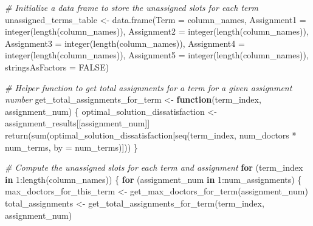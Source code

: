 \documentclass[
]{article}
\newenvironment{Shaded}{\begin{snugshade}}{\end{snugshade}}
\newcommand{\AttributeTok}[1]{\textcolor[rgb]{0.77,0.63,0.00}{#1}}
\newcommand{\CommentTok}[1]{\textcolor[rgb]{0.56,0.35,0.01}{\textit{#1}}}
\newcommand{\ConstantTok}[1]{\textcolor[rgb]{0.00,0.00,0.00}{#1}}
\newcommand{\ControlFlowTok}[1]{\textcolor[rgb]{0.13,0.29,0.53}{\textbf{#1}}}
\newcommand{\DecValTok}[1]{\textcolor[rgb]{0.00,0.00,0.81}{#1}}
\newcommand{\FunctionTok}[1]{\textcolor[rgb]{0.00,0.00,0.00}{#1}}
\newcommand{\NormalTok}[1]{#1}
\newcommand{\OtherTok}[1]{\textcolor[rgb]{0.56,0.35,0.01}{#1}}
\newcommand{\SpecialCharTok}[1]{\textcolor[rgb]{0.00,0.00,0.00}{#1}}
\begin{document}
\begin{Shaded}
\begin{Highlighting}[]
\CommentTok{\# Initialize a data frame to store the unassigned slots for each term}
\NormalTok{unassigned\_terms\_table }\OtherTok{\textless{}{-}} \FunctionTok{data.frame}\NormalTok{(}\AttributeTok{Term =}\NormalTok{ column\_names, }
                                     \AttributeTok{Assignment1 =} \FunctionTok{integer}\NormalTok{(}\FunctionTok{length}\NormalTok{(column\_names)), }
                                     \AttributeTok{Assignment2 =} \FunctionTok{integer}\NormalTok{(}\FunctionTok{length}\NormalTok{(column\_names)),}
                                     \AttributeTok{Assignment3 =} \FunctionTok{integer}\NormalTok{(}\FunctionTok{length}\NormalTok{(column\_names)),}
                                     \AttributeTok{Assignment4 =} \FunctionTok{integer}\NormalTok{(}\FunctionTok{length}\NormalTok{(column\_names)),}
                                     \AttributeTok{Assignment5 =} \FunctionTok{integer}\NormalTok{(}\FunctionTok{length}\NormalTok{(column\_names)),}
                                     \AttributeTok{stringsAsFactors =} \ConstantTok{FALSE}\NormalTok{)}

\CommentTok{\# Helper function to get total assignments for a term for a given assignment number}
\NormalTok{get\_total\_assignments\_for\_term }\OtherTok{\textless{}{-}} \ControlFlowTok{function}\NormalTok{(term\_index, assignment\_num) \{}
\NormalTok{  optimal\_solution\_dissatisfaction }\OtherTok{\textless{}{-}}\NormalTok{ assignment\_results[[assignment\_num]]}
  \FunctionTok{return}\NormalTok{(}\FunctionTok{sum}\NormalTok{(optimal\_solution\_dissatisfaction[}\FunctionTok{seq}\NormalTok{(term\_index, num\_doctors }\SpecialCharTok{*}\NormalTok{ num\_terms, }\AttributeTok{by =}\NormalTok{ num\_terms)]))}
\NormalTok{\}}

\CommentTok{\# Compute the unassigned slots for each term and assignment}
\ControlFlowTok{for}\NormalTok{ (term\_index }\ControlFlowTok{in} \DecValTok{1}\SpecialCharTok{:}\FunctionTok{length}\NormalTok{(column\_names)) \{}
  \ControlFlowTok{for}\NormalTok{ (assignment\_num }\ControlFlowTok{in} \DecValTok{1}\SpecialCharTok{:}\NormalTok{num\_assignments) \{}
\NormalTok{    max\_doctors\_for\_this\_term }\OtherTok{\textless{}{-}} \FunctionTok{get\_max\_doctors\_for\_term}\NormalTok{(assignment\_num)}
\NormalTok{    total\_assignments }\OtherTok{\textless{}{-}} \FunctionTok{get\_total\_assignments\_for\_term}\NormalTok{(term\_index, assignment\_num)}
    

\end{Highlighting}
\end{Shaded}
\end{document}
